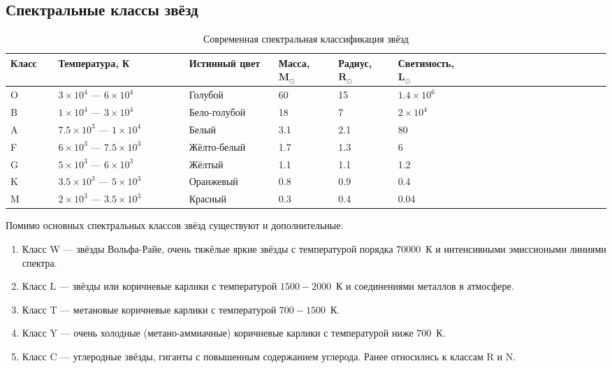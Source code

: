 \subsection{Спектральные классы звёзд}
\begin{center}
\begin{table}[h!]
\begin{tabular}{|p{0.08\linewidth}|p{0.22\linewidth}|p{0.15\linewidth}|p{0.1\linewidth}|p{0.1\linewidth}|p{0.1\linewidth}|p{0.1\linewidth}|p{0.4\linewidth}}
\hline
{\bfseries Класс} & {\bfseries Температура, К} & {\bfseries Истинный цвет} & {\bfseries Масса, $\mathbf{M_{\odot}}$} & {\bfseries Радиус, $\mathbf{R_{\odot}}$} & {\bfseries Светимость, $\mathbf{L_{\odot}}$}\\
\hline
O & $3 \times 10^4$ --- $6 \times 10^4$ & Голубой & 60 & 15 & $1.4 \times 10^6$\\
\hline
B & $1 \times 10^4$ --- $3 \times 10^4$ & Бело-голубой & 18 & 7 & $2 \times 10^4$\\
\hline
A & $7.5 \times 10^3$ --- $1 \times 10^4$ & Белый & 3.1 & 2.1 & 80\\
\hline
F & $6 \times 10^3$ --- $7.5 \times 10^3$ & Жёлто-белый & 1.7 & 1.3 & 6\\
\hline
G & $5 \times 10^3$ --- $6 \times 10^3$ & Жёлтый & 1.1 & 1.1 & 1.2\\
\hline 
K & $3.5 \times 10^3$ --- $5 \times 10^3$ & Оранжевый & 0.8 & 0.9 & 0.4\\
\hline
M & $2 \times 10^3$ --- $3.5 \times 10^3$ & Красный & 0.3 & 0.4 & 0.04\\
\hline
\end{tabular}
\caption{Современная спектральная классификация звёзд}
\end{table}
\end{center}

Помимо основных спектральных классов звёзд существуют и дополнительные:
\begin{enumerate}
\item Класс W --- звёзды Вольфа-Райе, очень тяжёлые яркие звёзды с температурой порядка $70000$~К и интенсивными эмиссиоными линиями спектра.
\item Класс L --- звёзды или коричневые карлики с температурой $1500 - 2000$~К и соединениями металлов в атмосфере.
\item Класс T --- метановые коричневые карлики с температурой $700 - 1500$~К.
\item Класс Y ---  очень холодные (метано-аммиачные) коричневые карлики с температурой ниже $700$~К.
\item Класс C --- углеродные звёзды, гиганты с повышенным содержанием углерода. Ранее относились к классам R и N.
\end{enumerate}

